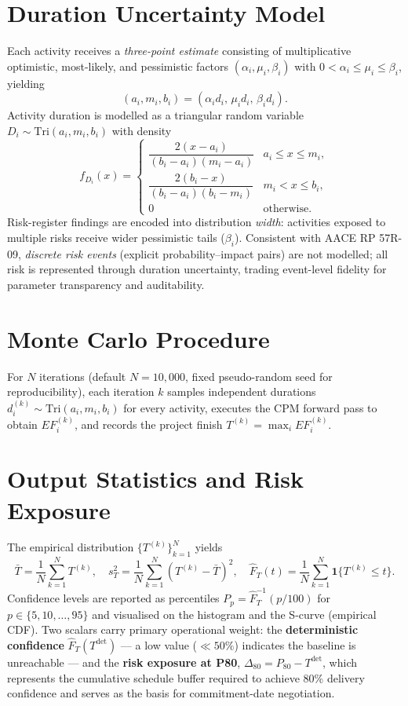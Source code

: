 \documentclass[10pt]{article}
\begin{document}
\section{Duration Uncertainty Model}
Each activity receives a \emph{three-point estimate} consisting of multiplicative optimistic, most-likely, and pessimistic factors $(\alpha_i, \mu_i, \beta_i)$ with $0 < \alpha_i \le \mu_i \le \beta_i$, yielding
\begin{equation}
(a_i, m_i, b_i) = (\alpha_i d_i,\, \mu_i d_i,\, \beta_i d_i).
\end{equation}
Activity duration is modelled as a triangular random variable $D_i \sim \mathrm{Tri}(a_i, m_i, b_i)$ with density
\begin{equation}
f_{D_i}(x) =
\begin{cases}
\dfrac{2(x - a_i)}{(b_i - a_i)(m_i - a_i)} & a_i \le x \le m_i, \\[0.2em]
\dfrac{2(b_i - x)}{(b_i - a_i)(b_i - m_i)} & m_i < x \le b_i, \\[0.2em]
0 & \text{otherwise.}
\end{cases}
\end{equation}
Risk-register findings are encoded into distribution \emph{width}: activities exposed to multiple risks receive wider pessimistic tails ($\beta_i$). Consistent with AACE RP 57R-09, \emph{discrete risk events} (explicit probability--impact pairs) are not modelled; all risk is represented through duration uncertainty, trading event-level fidelity for parameter transparency and auditability.

\section{Monte Carlo Procedure}
For $N$ iterations (default $N = 10{,}000$, fixed pseudo-random seed for reproducibility), each iteration $k$ samples independent durations $d_i^{(k)} \sim \mathrm{Tri}(a_i, m_i, b_i)$ for every activity, executes the CPM forward pass to obtain $EF_i^{(k)}$, and records the project finish $T^{(k)} = \max_{i} EF_i^{(k)}$.

\section{Output Statistics and Risk Exposure}
The empirical distribution $\{T^{(k)}\}_{k=1}^{N}$ yields
\begin{equation}
\bar{T} = \frac{1}{N}\sum_{k=1}^{N} T^{(k)}, \quad
s_T^2 = \frac{1}{N}\sum_{k=1}^{N}(T^{(k)} - \bar{T})^2, \quad
\hat{F}_T(t) = \frac{1}{N}\sum_{k=1}^{N} \mathbf{1}\{T^{(k)} \le t\}.
\end{equation}
Confidence levels are reported as percentiles $P_p = \hat{F}_T^{-1}(p/100)$ for $p \in \{5, 10, \ldots, 95\}$ and visualised on the histogram and the S-curve (empirical CDF). Two scalars carry primary operational weight: the \textbf{deterministic confidence} $\hat{F}_T(T^{\text{det}})$ --- a low value ($\ll 50\%$) indicates the baseline is unreachable --- and the \textbf{risk exposure at P80}, $\Delta_{80} = P_{80} - T^{\text{det}}$, which represents the cumulative schedule buffer required to achieve 80\% delivery confidence and serves as the basis for commitment-date negotiation.
\end{document}
